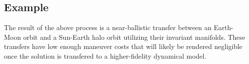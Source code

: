 \subsection{Example}
The result of the above process is a near-ballistic transfer between an Earth-Moon orbit and a
Sun-Earth halo orbit utilizing their invariant manifolds. These transfers have low enough maneuver
costs that will likely be rendered negligible once the solution is transfered to a higher-fidelity
dynamical model. 
